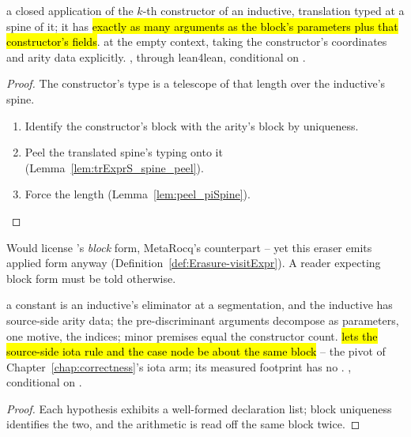 \begin{theorem}
\label{thm:ctor_saturated}
\leanok
{} a closed application of the $k$-th constructor of an inductive, translation typed at
a spine of it;
 it has \hl{exactly as many arguments as the block's parameters plus that constructor's
fields}.
 at the empty context, taking the constructor's coordinates and arity data explicitly.
 \stProved{}, \stInherited{} through lean4lean, conditional on \stAssumed{}
.
\end{theorem}
\begin{proof}
\leanok
{}
 The constructor's type is a telescope of that length over the inductive's spine.
\begin{enumerate}
\item Identify the constructor's block with the arity's block by uniqueness.
\item Peel the translated spine's typing onto it (Lemma~\ref{lem:trExprS_spine_peel}).
\item Force the length (Lemma~\ref{lem:peel_piSpine}).
\end{enumerate}
\end{proof}

\begin{remark}
 Would license \lbox{}'s \emph{block} form, MetaRocq's
 counterpart -- yet this eraser emits applied form anyway
(Definition~\ref{def:Erasure-visitExpr}). A reader expecting block form must be told otherwise.
\end{remark}

\begin{theorem}
\label{thm:CasesOnShape-agree}
\leanok
{} a constant is an inductive's eliminator at a segmentation, and the inductive has
source-side arity data;
 the pre-discriminant arguments decompose as parameters, one motive, the indices;
minor premises equal the constructor count.
 \hl{lets the source-side iota rule and the \lbox{} case node be about the same block}
-- the pivot of Chapter~\ref{chap:correctness}'s iota arm; its measured footprint has no
.
 \stProved{}, conditional on \stAssumed{} .
\end{theorem}
\begin{proof}
\leanok
{}
 Each hypothesis exhibits a well-formed declaration list; block uniqueness identifies
the two, and the arithmetic is read off the same block twice.
\end{proof}

